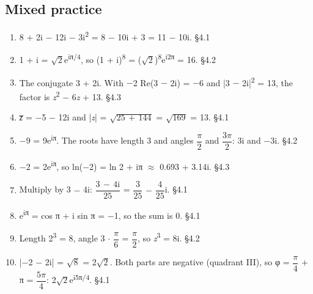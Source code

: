 \documentclass[11pt]{article}
\begin{document}
\begin{keepsection}\subsection{Mixed practice}

\begin{enumerate}
\item 8 + 2i \ensuremath{-} 12i \ensuremath{-} 3i\textsuperscript{2} = 8 \ensuremath{-} 10i + 3 = 11 \ensuremath{-} 10i. \hfill{\small\color{FAUblue}§4.1}
\item 1 + i = \ensuremath{\sqrt{2}}e\textsuperscript{iπ/4}, so (1 + i)\textsuperscript{8} = (\ensuremath{\sqrt{2}})\textsuperscript{8}e\textsuperscript{i2π} = 16. \hfill{\small\color{FAUblue}§4.2}
\item The conjugate 3 + 2i. With \ensuremath{-}2 Re(3 \ensuremath{-} 2i) = \ensuremath{-}6 and |3 \ensuremath{-} 2i|\textsuperscript{2} = 13, the factor is \textit{z}\textsuperscript{2} \ensuremath{-} 6\textit{z} + 13. \hfill{\small\color{FAUblue}§4.3}
\item \textit{z̅} = \ensuremath{-}5 \ensuremath{-} 12i and |\textit{z}| = \ensuremath{\sqrt{25\, +\, 144}} = \ensuremath{\sqrt{169}} = 13. \hfill{\small\color{FAUblue}§4.1}
\item \ensuremath{-}9 = 9e\textsuperscript{iπ}. The roots have length 3 and angles {\small\ensuremath{\dfrac{π}{2}}} and {\small\ensuremath{\dfrac{3π}{2}}}: 3i and \ensuremath{-}3i. \hfill{\small\color{FAUblue}§4.2}
\item \ensuremath{-}2 = 2e\textsuperscript{iπ}, so ln(\ensuremath{-}2) = ln 2 + iπ \ensuremath{\approx} 0.693 + 3.14i. \hfill{\small\color{FAUblue}§4.3}
\item Multiply by 3 \ensuremath{-} 4i: {\small\ensuremath{\dfrac{3\, -\, 4\mathrm{i}}{25}}} = {\small\ensuremath{\dfrac{3}{25}}} \ensuremath{-} {\small\ensuremath{\dfrac{4}{25}}}i. \hfill{\small\color{FAUblue}§4.1}
\item e\textsuperscript{iπ} = cos π + i sin π = \ensuremath{-}1, so the sum is 0. \hfill{\small\color{FAUblue}§4.1}
\item Length 2\textsuperscript{3} = 8, angle 3 \ensuremath{\cdot} {\small\ensuremath{\dfrac{π}{6}}} = {\small\ensuremath{\dfrac{π}{2}}}, so \textit{z}\textsuperscript{3} = 8i. \hfill{\small\color{FAUblue}§4.2}
\item |\ensuremath{-}2 \ensuremath{-} 2i| = \ensuremath{\sqrt{8}} = 2\ensuremath{\sqrt{2}}. Both parts are negative (quadrant III), so φ = {\small\ensuremath{\dfrac{π}{4}}} + π = {\small\ensuremath{\dfrac{5π}{4}}}: 2\ensuremath{\sqrt{2}}e\textsuperscript{i5π/4}. \hfill{\small\color{FAUblue}§4.1}

\end{enumerate}
\end{keepsection}
\end{document}
